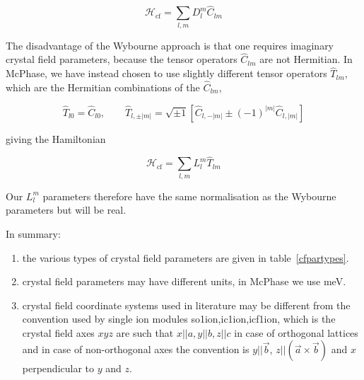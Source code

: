 \[
\mathcal{H}_{\mathrm{cf}} = \sum_{l,m} D_l^{m} \hat{C}_{lm}
\]

The disadvantage of the Wybourne approach is that one requires imaginary crystal field parameters, because the
tensor operators $\hat{C}_{lm}$ are not Hermitian. In {\prg McPhase}, we have instead chosen to use slightly
different tensor operators $\hat{T}_{lm}$, which are the Hermitian combinations of the $\hat{C}_{lm}$,

\[
  \hat{T}_{l0} = \hat{C}_{l0}, \qquad \hat{T}_{l,\pm|m|} = \sqrt{\pm 1} \left[ \hat{C}_{l,-|m|} \pm (-1)^{|m|} \hat{C}_{l,|m|} \right]
\]

\noindent giving the Hamiltonian

\[
\mathcal{H}_{\mathrm{cf}} = \sum_{l,m} L_l^m \hat{T}_{lm}
\]

Our $L_l^m$ parameters therefore have the same normalisation as the Wybourne parameters but will be real.

In summary:
\begin{enumerate}
 \item  the various types of crystal field parameters are given in 
table~\ref{cfpartypes}.
\item crystal field parameters may have different units, in {\prg
McPhase} we use meV.
\item crystal field coordinate systems used in literature may be 
different from the convention used by single ion modules {\prg so1ion,ic1ion,icf1ion},
which is the crystal field axes $xyz$ are such that $x||a,y||b,z||c$ in case
of orthogonal lattices and in case of non-orthogonal axes 
the convention is $y||\vec b$, $z||(\vec a \times \vec b)$ and $x$ perpendicular to $y$ and $z$.
\end{enumerate}

